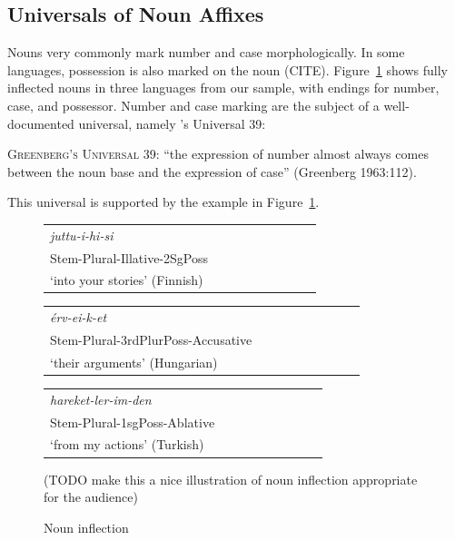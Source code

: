 \documentclass[11pt,letterpaper]{article}
\newcommand{\citep}{\parencite}
\newcommand\mhahn[1]{{\color{red}(#1)}}
\begin{document}
\subsection{Universals of Noun Affixes}\label{sec:univ-nouns}
Nouns very commonly mark number and case morphologically.
In some languages, possession is also marked on the noun (CITE).
Figure~\ref{fig:noun-inflection} shows fully inflected nouns in three languages from our sample, with endings for number, case, and possessor.
Number and case marking are the subject of a well-documented universal, namely \citep{greenberg1963universals}'s Universal 39:

\begin{adjustwidth}{6em}{6em}
\textsc{Greenberg's Universal 39}:
``the expression of number almost always comes between the noun base and the expression of case'' (Greenberg 1963:112).
\end{adjustwidth}

This universal is supported by the example in Figure~\ref{fig:noun-inflection}.



\begin{figure}
\begin{tabular}{lllllllll}
\textit{juttu-i-hi-si} \\
Stem-Plural-Illative-2SgPoss \\
`into your stories' (Finnish)
\end{tabular}
\begin{tabular}{lllllllll}
	\textit{{\'e}rv-ei-k-et} \\
Stem-Plural-3rdPlurPoss-Accusative \\
`their arguments' (Hungarian)
\end{tabular}
\begin{tabular}{lllllllll}
\textit{hareket-ler-im-den} \\
Stem-Plural-1sgPoss-Ablative\\
`from my actions' (Turkish) \\
\end{tabular}

\mhahn{TODO make this a nice illustration of noun inflection appropriate for the audience}

\caption{Noun inflection}\label{fig:noun-inflection}
\end{figure}
\end{document}
